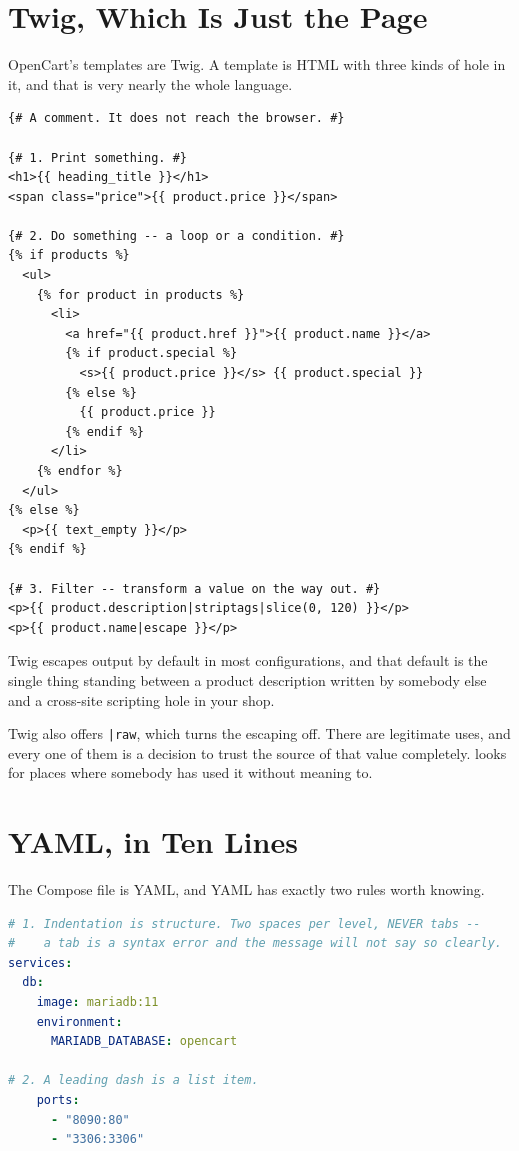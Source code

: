 \section{Twig, Which Is Just the Page}

OpenCart's templates are Twig. A template is HTML with three kinds of hole in
it, and that is very nearly the whole language.

\begin{lstlisting}[language=twig]
{# A comment. It does not reach the browser. #}

{# 1. Print something. #}
<h1>{{ heading_title }}</h1>
<span class="price">{{ product.price }}</span>

{# 2. Do something -- a loop or a condition. #}
{% if products %}
  <ul>
    {% for product in products %}
      <li>
        <a href="{{ product.href }}">{{ product.name }}</a>
        {% if product.special %}
          <s>{{ product.price }}</s> {{ product.special }}
        {% else %}
          {{ product.price }}
        {% endif %}
      </li>
    {% endfor %}
  </ul>
{% else %}
  <p>{{ text_empty }}</p>
{% endif %}

{# 3. Filter -- transform a value on the way out. #}
<p>{{ product.description|striptags|slice(0, 120) }}</p>
<p>{{ product.name|escape }}</p>
\end{lstlisting}

\begin{alertbox}
Twig escapes output by default in most configurations, and that default is the
single thing standing between a product description written by somebody else
and a cross-site scripting hole in your shop.

\smallskip
Twig also offers \texttt{|raw}, which turns the escaping off. There are
legitimate uses, and every one of them is a decision to trust the source of
that value completely.  looks for places where somebody has
used it without meaning to.
\end{alertbox}

\section{YAML, in Ten Lines}

The Compose file is YAML, and YAML has exactly two rules worth knowing.

\begin{lstlisting}[language=yaml]
# 1. Indentation is structure. Two spaces per level, NEVER tabs --
#    a tab is a syntax error and the message will not say so clearly.
services:
  db:
    image: mariadb:11
    environment:
      MARIADB_DATABASE: opencart

# 2. A leading dash is a list item.
    ports:
      - "8090:80"
      - "3306:3306"
\end{lstlisting}

